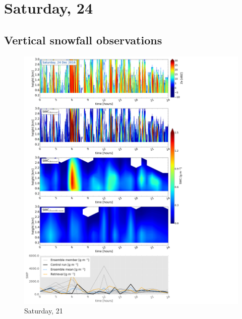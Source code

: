 \section{Saturday, \SI{24}{\dec}}

\subsection{Vertical snowfall observations}
\begin{figure}[h]
	\includegraphics[trim={0.5cm 0.5cm 17.5cm .5cm},clip,width=\textwidth]{./fig_SWC/20161224}
	\caption{Saturday, \SI{21}{\dec}}\label{fig:SWC24}
\end{figure}
%
% 

